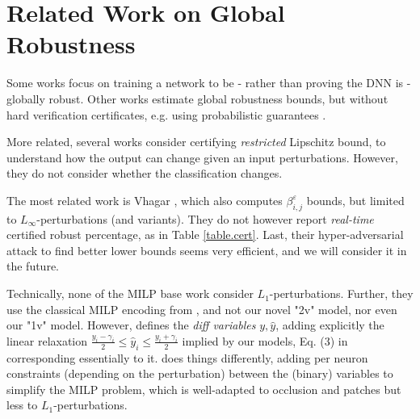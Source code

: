 \section{Related Work on Global Robustness}

Some works \cite{Leino,Zhang22a,Sun22,Chen21,REGLO} focus on training a network to be - rather than proving the DNN is - globally robust.
Other works \cite{Bastani16,Ruan19,Gopinath18} estimate global robustness bounds, but without hard verification certificates, e.g. using probabilistic guarantees 
\cite{Levy23,Mangal19}.

More related, several works  \cite{Marabou,lipshitz,ITNE,GROCET} consider certifying {\em restricted} Lipschitz bound, to understand how the output can change given an input perturbations. However, they do not consider whether the classification changes. 

The most related work is Vhagar \cite{vhagar}, which also computes $\beta^\varepsilon_{i,j}$ bounds, but limited to $L_\infty$-perturbations (and variants). They do not however report {\em real-time} certified robust percentage, as in Table \ref{table.cert}. Last, their hyper-adversarial attack to find better lower bounds seems very efficient, and we will consider it in the future.

Technically, none of the MILP base work \cite{vhagar,lipshitz,ITNE} 
consider $L_1$-perturbations. Further, they use the classical MILP encoding from \cite{MILP}, and not our novel "2v" model, nor even our "1v" model. However, \cite{ITNE} 
defines the {\em diff variables} $y,\hat{y}$, adding explicitly the linear relaxation $\frac{y_i-\gamma_i}{2} \leq \hat{y}_i \leq \frac{y_i+\gamma_i}{2}$ implied by our models, Eq. (3) in \cite{ITNE} corresponding essentially to it. \cite{vhagar} does things differently, adding per neuron constraints (depending on the perturbation) between the (binary) variables to simplify the MILP problem, which is well-adapted to occlusion and patches but less to $L_1$-perturbations. 

